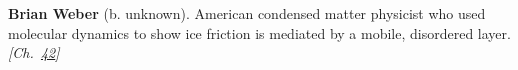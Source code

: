 \textbf{Brian Weber} (b. unknown). American condensed matter physicist who used molecular dynamics to show ice friction is mediated by a mobile, disordered layer. \emph{[Ch.~\hyperref[ch:iceslipperiness]{42}]}

